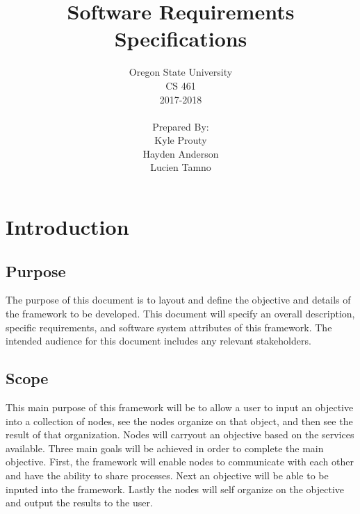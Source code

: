 \documentclass[draftclsnofoot, onecolumn, compsoc, 10pt]{IEEEtran}
\title{\huge Software Requirements Specifications}
\author{Oregon State University\\CS 461\\2017-2018\\\\Prepared By:\\ Kyle Prouty\\Hayden Anderson\\Lucien Tamno\\}
\begin{document}
\begin{titlingpage}
    \maketitle 
\end{titlingpage}

\tableofcontents
\pagebreak

\section{Introduction}
\subsection{Purpose}
The purpose of this document is to layout and define the objective and details of the framework to be developed. This document will specify an overall description, specific requirements, and software system attributes of this framework. The intended audience for this document includes any relevant stakeholders. 

\subsection{Scope}
This main purpose of this framework will be to allow a user to input an objective into a collection of nodes, see the nodes organize on that object, and then see the result of that organization. Nodes will carryout an objective based on the services available. Three main goals will be achieved in order to complete the main objective. First, the framework will enable nodes to communicate with each other and have the ability to share processes. Next an objective will be able to be inputed into the framework. Lastly the nodes will self organize on the objective and output the results to the user.
\end{document}
